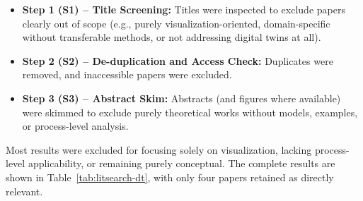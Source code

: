 \begin{itemize}
    \item \textbf{Step 1 (S1) – Title Screening:} Titles were inspected to exclude papers clearly out of scope (e.g., purely visualization-oriented, domain-specific without transferable methods, or not addressing digital twins at all).
    \item \textbf{Step 2 (S2) – De-duplication and Access Check:} Duplicates were removed, and inaccessible papers were excluded.
    \item \textbf{Step 3 (S3) – Abstract Skim:} Abstracts (and figures where available) were skimmed to exclude purely theoretical works without models, examples, or process-level analysis.
\end{itemize}

Most results were excluded for focusing solely on visualization, lacking process-level applicability, or remaining purely conceptual. The complete results are shown in Table~\ref{tab:litsearch-dt}, with only four papers retained as directly relevant.


